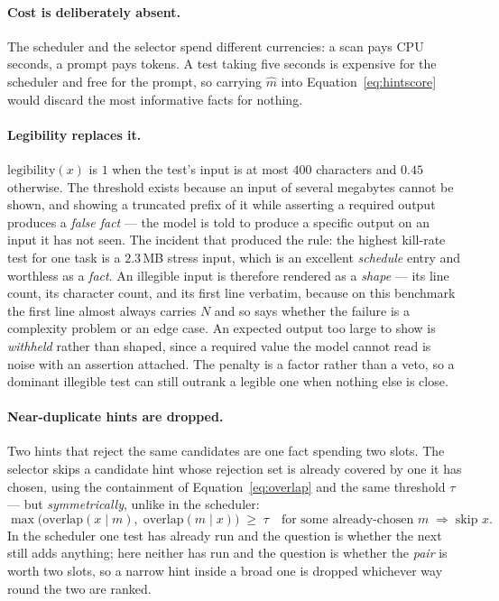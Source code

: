 \paragraph{Cost is deliberately absent.} The scheduler and the selector spend
different currencies: a scan pays CPU seconds, a prompt pays tokens. A test
taking five seconds is expensive for the scheduler and free for the prompt, so
carrying $\hat{m}$ into Equation~\eqref{eq:hintscore} would discard the most
informative facts for nothing.

\paragraph{Legibility replaces it.} $\mathrm{legibility}(x)$ is $1$ when the
test's input is at most $400$ characters and $0.45$ otherwise. The threshold
exists because an input of several megabytes cannot be shown, and showing a
truncated prefix of it while asserting a required output produces a
\emph{false fact} --- the model is told to produce a specific output on an
input it has not seen. The incident that produced the rule: the highest
kill-rate test for one task is a $2.3$\,MB stress input, which is an excellent
\emph{schedule} entry and worthless as a \emph{fact}. An illegible input is
therefore rendered as a \emph{shape} --- its line count, its character count,
and its first line verbatim, because on this benchmark the first line almost
always carries $N$ and so says whether the failure is a complexity problem or
an edge case. An expected output too large to show is \emph{withheld} rather
than shaped, since a required value the model cannot read is noise with an
assertion attached. The penalty is a factor rather than a veto, so a dominant
illegible test can still outrank a legible one when nothing else is close.

\paragraph{Near-duplicate hints are dropped.} Two hints that reject the same
candidates are one fact spending two slots. The selector skips a candidate
hint whose rejection set is already covered by one it has chosen, using the
containment of Equation~\eqref{eq:overlap} and the same threshold $\tau$ ---
but \emph{symmetrically}, unlike in the scheduler:
\begin{equation}
\max\bigl(\mathrm{overlap}(x \mid m),\; \mathrm{overlap}(m \mid x)\bigr) \;\ge\; \tau
\quad\text{for some already-chosen } m \;\Longrightarrow\; \text{skip } x .
\label{eq:hintdedup}
\end{equation}
In the scheduler one test has already run and the question is whether the next
still adds anything; here neither has run and the question is whether the
\emph{pair} is worth two slots, so a narrow hint inside a broad one is dropped
whichever way round the two are ranked.

